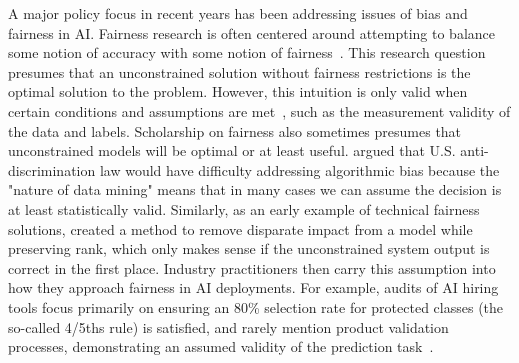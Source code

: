 \documentclass[acmconf,manuscript,screen,natbib=true]{acmart}
\begin{document}
A major policy focus in recent years has been addressing issues of bias and fairness in AI. Fairness research is often centered around attempting to balance some notion of accuracy with some notion of fairness~\cite{friedler2019comparative, fish2016confidence, disparate_impact_suresh}. This research question presumes that an unconstrained solution without fairness restrictions is the optimal solution to the problem. However, this intuition is only valid when certain conditions and assumptions are met~\cite{Mitchell2021-pk, impossibility_of_fairness, fairness_tradeoffs_neurips}, such as the measurement validity of the data and labels. Scholarship on fairness also sometimes presumes that unconstrained models will be optimal or at least useful. \citet[p.~707]{barocas2016big} argued that U.S. anti-discrimination law would have difficulty addressing algorithmic bias because the "nature of data mining" means that in many cases we can assume the decision is at least statistically valid. 
Similarly, as an early example of technical fairness solutions, \citet{feldman2015certifying} created a method to remove disparate impact from a model while preserving rank, which only makes sense if the unconstrained system output is correct in the first place. %
Industry practitioners then carry this assumption into how they approach fairness in AI deployments. For example, audits of AI hiring tools focus primarily on ensuring an 80\% selection rate for protected classes (the so-called 4/5ths rule) is satisfied, and rarely mention product validation processes, demonstrating an assumed validity of the prediction task~\cite{raghavan2020mitigating, wilson2021building, engler2021independent}.
\end{document}
